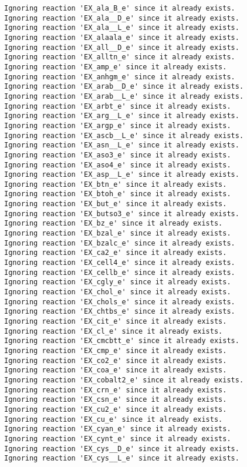 \documentclass[
  letterpaper,
  DIV=11,
  numbers=noendperiod]{scrartcl}
\begin{document}
\begin{verbatim}
Ignoring reaction 'EX_ala_B_e' since it already exists.
Ignoring reaction 'EX_ala__D_e' since it already exists.
Ignoring reaction 'EX_ala__L_e' since it already exists.
Ignoring reaction 'EX_alaala_e' since it already exists.
Ignoring reaction 'EX_all__D_e' since it already exists.
Ignoring reaction 'EX_alltn_e' since it already exists.
Ignoring reaction 'EX_amp_e' since it already exists.
Ignoring reaction 'EX_anhgm_e' since it already exists.
Ignoring reaction 'EX_arab__D_e' since it already exists.
Ignoring reaction 'EX_arab__L_e' since it already exists.
Ignoring reaction 'EX_arbt_e' since it already exists.
Ignoring reaction 'EX_arg__L_e' since it already exists.
Ignoring reaction 'EX_argp_e' since it already exists.
Ignoring reaction 'EX_ascb__L_e' since it already exists.
Ignoring reaction 'EX_asn__L_e' since it already exists.
Ignoring reaction 'EX_aso3_e' since it already exists.
Ignoring reaction 'EX_aso4_e' since it already exists.
Ignoring reaction 'EX_asp__L_e' since it already exists.
Ignoring reaction 'EX_btn_e' since it already exists.
Ignoring reaction 'EX_btoh_e' since it already exists.
Ignoring reaction 'EX_but_e' since it already exists.
Ignoring reaction 'EX_butso3_e' since it already exists.
Ignoring reaction 'EX_bz_e' since it already exists.
Ignoring reaction 'EX_bzal_e' since it already exists.
Ignoring reaction 'EX_bzalc_e' since it already exists.
Ignoring reaction 'EX_ca2_e' since it already exists.
Ignoring reaction 'EX_cell4_e' since it already exists.
Ignoring reaction 'EX_cellb_e' since it already exists.
Ignoring reaction 'EX_cgly_e' since it already exists.
Ignoring reaction 'EX_chol_e' since it already exists.
Ignoring reaction 'EX_chols_e' since it already exists.
Ignoring reaction 'EX_chtbs_e' since it already exists.
Ignoring reaction 'EX_cit_e' since it already exists.
Ignoring reaction 'EX_cl_e' since it already exists.
Ignoring reaction 'EX_cmcbtt_e' since it already exists.
Ignoring reaction 'EX_cmp_e' since it already exists.
Ignoring reaction 'EX_co2_e' since it already exists.
Ignoring reaction 'EX_coa_e' since it already exists.
Ignoring reaction 'EX_cobalt2_e' since it already exists.
Ignoring reaction 'EX_crn_e' since it already exists.
Ignoring reaction 'EX_csn_e' since it already exists.
Ignoring reaction 'EX_cu2_e' since it already exists.
Ignoring reaction 'EX_cu_e' since it already exists.
Ignoring reaction 'EX_cyan_e' since it already exists.
Ignoring reaction 'EX_cynt_e' since it already exists.
Ignoring reaction 'EX_cys__D_e' since it already exists.
Ignoring reaction 'EX_cys__L_e' since it already exists.

\end{verbatim}
\end{document}
